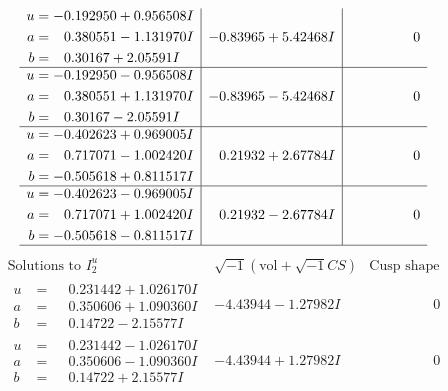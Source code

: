 \documentclass[1p]{elsarticle_modified}
\theoremstyle{definition}
\newcommand{\I}{\sqrt{-1}}
\begin{document}
$$\begin{array}{c|c|c}
\begin{aligned}
u &= -0.192950 + 0.956508 I \\
a &= \phantom{-}0.380551 - 1.131970 I \\
b &= \phantom{-}0.30167 + 2.05591 I\end{aligned}
 & -0.83965 + 5.42468 I & \phantom{-0.000000 } 0 \\ \hline\begin{aligned}
u &= -0.192950 - 0.956508 I \\
a &= \phantom{-}0.380551 + 1.131970 I \\
b &= \phantom{-}0.30167 - 2.05591 I\end{aligned}
 & -0.83965 - 5.42468 I & \phantom{-0.000000 } 0 \\ \hline\begin{aligned}
u &= -0.402623 + 0.969005 I \\
a &= \phantom{-}0.717071 - 1.002420 I \\
b &= -0.505618 + 0.811517 I\end{aligned}
 & \phantom{-}0.21932 + 2.67784 I & \phantom{-0.000000 } 0 \\ \hline\begin{aligned}
u &= -0.402623 - 0.969005 I \\
a &= \phantom{-}0.717071 + 1.002420 I \\
b &= -0.505618 - 0.811517 I\end{aligned}
 & \phantom{-}0.21932 - 2.67784 I & \phantom{-0.000000 } 0\\
 \hline 
 \end{array}$$\newpage$$\begin{array}{c|c|c}  
\text{Solutions to }I^u_{2}& \I (\text{vol} + \sqrt{-1}CS) & \text{Cusp shape}\\
 \hline 
\begin{aligned}
u &= \phantom{-}0.231442 + 1.026170 I \\
a &= \phantom{-}0.350606 + 1.090360 I \\
b &= \phantom{-}0.14722 - 2.15577 I\end{aligned}
 & -4.43944 - 1.27982 I & \phantom{-0.000000 } 0 \\ \hline\begin{aligned}
u &= \phantom{-}0.231442 - 1.026170 I \\
a &= \phantom{-}0.350606 - 1.090360 I \\
b &= \phantom{-}0.14722 + 2.15577 I\end{aligned}
 & -4.43944 + 1.27982 I & \phantom{-0.000000 } 0 \\ \hline\begin{aligned}

\end{aligned}
\end{array}$$
\end{document}
